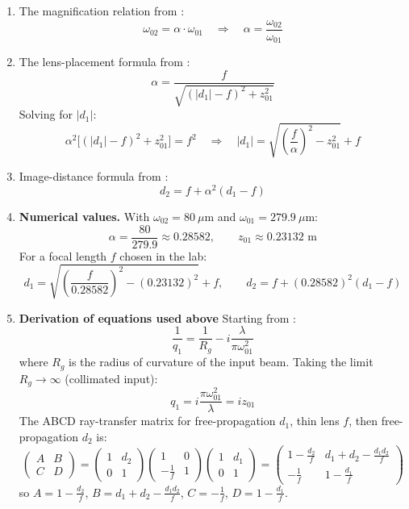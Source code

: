 \documentclass[11pt, letterpaper]{article}
\begin{document}
\begin{enumerate}
    \item The magnification relation from \cite{edmund}:
\begin{equation}\label{M}
    \omega_{02}=\alpha\cdot\omega_{01}
    \quad\Rightarrow\quad
    \alpha=\frac{\omega_{02}}{\omega_{01}}
\end{equation}

    \item The lens-placement formula from \cite{edmund}:
\begin{equation}\label{18}
    \alpha = \frac{f}{\sqrt{(|d_1| - f)^2 + z_{01}^2}}
\end{equation}
Solving for $|d_1|$:
$$\alpha^2\bigl[(|d_1|-f)^2+z_{01}^2\bigr]=f^2
\quad\Rightarrow\quad
|d_1|=\sqrt{\left(\frac{f}{\alpha}\right)^2-z_{01}^2}+f$$

    \item Image-distance formula from \cite{edmund}:
\begin{equation}\label{22}
    d_2 = f + \alpha^2(d_1 - f)
\end{equation}

    \item \textbf{Numerical values.} With $\omega_{02}=80~\mu$m and $\omega_{01}=279.9~\mu$m:
$$\alpha=\frac{80}{279.9}\approx 0.28582,\qquad z_{01}\approx 0.23132\text{ m}$$
For a focal length $f$ chosen in the lab:
$$d_1 = \sqrt{\left(\frac{f}{0.28582}\right)^2-(0.23132)^2}+f,
\qquad
d_2 = f + (0.28582)^2(d_1-f)$$

    \item \textbf{Derivation of equations used above} Starting from \cite{Osche}:
\begin{equation}\label{complex}
    \frac{1}{q_1} = \frac{1}{R_{g}} - i\frac{\lambda}{\pi \omega_{01}^2}
\end{equation}
where $R_g$ is the radius of curvature of the input beam. Taking the limit $R_g\to\infty$ (collimated input):
$$q_1 = i\frac{\pi \omega_{01}^2}{\lambda}=iz_{01}$$
The ABCD ray-transfer matrix for free-propagation $d_1$, thin lens $f$, then free-propagation $d_2$ is:
$$\begin{pmatrix} A & B \\ C & D \end{pmatrix}
= \begin{pmatrix} 1 & d_2 \\ 0 & 1 \end{pmatrix}
  \begin{pmatrix} 1 & 0 \\ -\frac{1}{f} & 1 \end{pmatrix}
  \begin{pmatrix} 1 & d_1 \\ 0 & 1 \end{pmatrix}
=\begin{pmatrix} 1 - \frac{d_2}{f} & d_1 + d_2 - \frac{d_1 d_2}{f} \\ -\frac{1}{f} & 1 - \frac{d_1}{f} \end{pmatrix}$$
so $A=1 - \frac{d_2}{f}$, $B=d_1 + d_2 - \frac{d_1 d_2}{f}$, $C=-\frac{1}{f}$, $D=1 - \frac{d_1}{f}$.


\end{enumerate}
\end{document}
